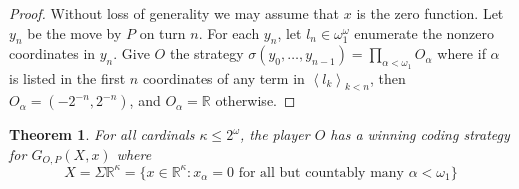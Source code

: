 \documentclass[11pt]{article}
\theoremstyle{plain}
\newtheorem{theorem}{Theorem}
\theoremstyle{definition}
\theoremstyle{remark}
\begin{document}
\begin{proof}
Without loss of generality we may assume that $x$ is the zero function. Let $y_n$ be the move by $P$ on turn $n$. For each $y_n$, let $l_n\in \omega_1^{\omega}$ enumerate the nonzero coordinates in $y_n$. Give $O$ the strategy $\sigma(y_0,\dots,y_{n-1}) = \prod_{\alpha<\omega_1} O_\alpha$ where if $\alpha$ is listed in the first $n$ coordinates of any term in $\left<l_k\right>_{k<n}$, then $O_\alpha=(-2^{-n},2^{-n})$, and $O_\alpha=\mathbb{R}$ otherwise.
\end{proof}

%
%

\begin{theorem}
For all cardinals $\kappa\leq 2^\omega$, the player $O$ has a winning coding strategy for $G_{O,P}(X,x)$ where \[X=\Sigma\mathbb{R}^{\kappa}=\{x\in \mathbb{R}^{\kappa}: x_\alpha = 0 \text{ for all but countably many } \alpha<\omega_1\}\]
\end{theorem}
\end{document}
